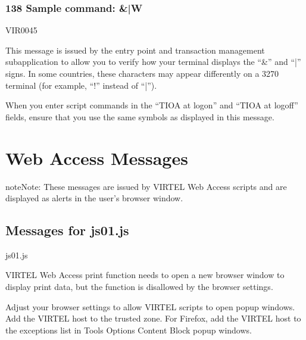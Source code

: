 \documentclass[letterpaper,10pt,english]{sphinxmanual}
\begin{document}
\subsubsection{138 Sample command: \&|W}
\label{\detokenize{messages:sample-command-w}}\begin{description}
\sphinxAtStartPar
VIR0045

\sphinxAtStartPar
This message is issued by the entry point and transaction management sub\sphinxhyphen{}application to allow you to verify how your terminal displays the “\&” and “|” signs. In some countries, these characters may appear differently on a 3270 terminal (for example, “!” instead of “|”).

\sphinxAtStartPar
When you enter script commands in the “TIOA at logon” and “TIOA at logoff” fields, ensure that you use the same symbols as displayed in this message.

\end{description}


\section{Web Access Messages}
\label{\detokenize{messages:web-access-messages}}
\begin{sphinxadmonition}{note}{Note:}
\sphinxAtStartPar
These messages are issued by VIRTEL Web Access scripts and are displayed as alerts in the user’s browser window.
\end{sphinxadmonition}


\subsection{Messages for js01.js}
\label{\detokenize{messages:messages-for-js01-js}}
\sphinxAtStartPar
{}
\begin{description}
\sphinxAtStartPar
js01.js

\sphinxAtStartPar
VIRTEL Web Access print function needs to open a new browser window to display print data, but the function is disallowed by the browser settings.

\sphinxAtStartPar
Adjust your browser settings to allow VIRTEL scripts to open pop\sphinxhyphen{}up windows. Add the VIRTEL host to the trusted zone. For Firefox, add the VIRTEL host to the exceptions list in Tools \textendash{} Options \textendash{} Content \textendash{} Block pop\sphinxhyphen{}up windows.

\end{description}
\end{document}
